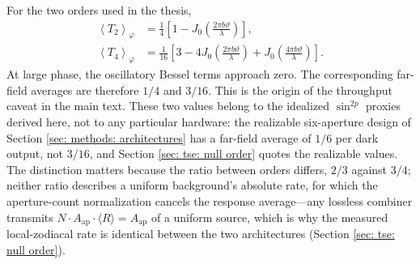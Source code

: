 \documentclass[12pt,a4paper]{article}
\numberwithin{equation}{section}
\numberwithin{figure}{section}
\numberwithin{table}{section}
\begin{document}
For the two orders used in the thesis,
\begin{align}
\left\langle T_2\right\rangle_\varphi
&=\frac14\left[1-J_0\left(\frac{2\pi b\vartheta}{\lambda}\right)\right],\\
\left\langle T_4\right\rangle_\varphi
&=\frac1{16}\left[
3-4J_0\left(\frac{2\pi b\vartheta}{\lambda}\right)
+J_0\left(\frac{4\pi b\vartheta}{\lambda}\right)
\right].
\end{align}
At large phase, the oscillatory Bessel terms approach zero. The corresponding far-field averages are therefore $1/4$ and $3/16$. This is the origin of the throughput caveat in the main text. These two values belong to the idealized $\sin^{2p}$ proxies derived here, not to any particular hardware: the realizable six-aperture design of Section \ref{sec: methods: architectures} has a far-field average of $1/6$ per dark output, not $3/16$, and Section \ref{sec: tse: null order} quotes the realizable values. The distinction matters because the ratio between orders differs, $2/3$ against $3/4$; neither ratio describes a uniform background's absolute rate, for which the aperture-count normalization cancels the response average---any lossless combiner transmits $N \cdot A_{\mathrm{ap}} \cdot \langle R \rangle = A_{\mathrm{ap}}$ of a uniform source, which is why the measured local-zodiacal rate is identical between the two architectures (Section \ref{sec: tse: null order}).
\end{document}
